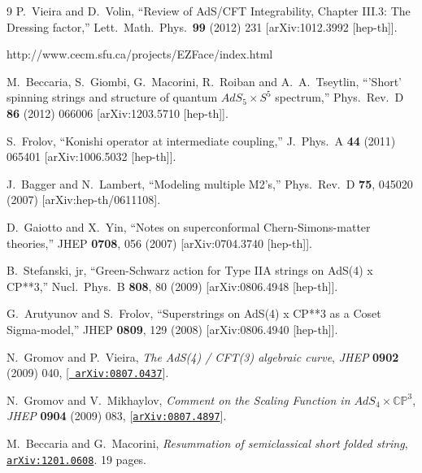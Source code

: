 \documentclass[a4paper,11pt]{article}
\numberwithin{equation}{section}
\begin{document}
\begin{thebibliography} {9}
  P.~Vieira and D.~Volin,
  ``Review of AdS/CFT Integrability, Chapter III.3: The Dressing factor,''
  Lett.\ Math.\ Phys.\  {\bf 99} (2012) 231
  [arXiv:1012.3992 [hep-th]].

 http://www.cecm.sfu.ca/projects/EZFace/index.html

  M.~Beccaria, S.~Giombi, G.~Macorini, R.~Roiban and A.~A.~Tseytlin,
  ``'Short' spinning strings and structure of quantum $AdS_5 \times S^5$ spectrum,''
  Phys.\ Rev.\ D {\bf 86} (2012) 066006
  [arXiv:1203.5710 [hep-th]].

  S.~Frolov,
  ``Konishi operator at intermediate coupling,''
  J.\ Phys.\ A {\bf 44} (2011) 065401
  [arXiv:1006.5032 [hep-th]].

  J.~Bagger and N.~Lambert,
  ``Modeling multiple M2's,''
  Phys.\ Rev.\  D {\bf 75}, 045020 (2007)
  [arXiv:hep-th/0611108].

D.~Gaiotto and X.~Yin,
  ``Notes on superconformal Chern-Simons-matter theories,''
  JHEP {\bf 0708}, 056 (2007)
  [arXiv:0704.3740 [hep-th]]. 

  B.~Stefanski, jr,
  ``Green-Schwarz action for Type IIA strings on AdS(4) x CP**3,''
  Nucl.\ Phys.\ B {\bf 808}, 80 (2009)
  [arXiv:0806.4948 [hep-th]].

  G.~Arutyunov and S.~Frolov,
  ``Superstrings on AdS(4) x CP**3 as a Coset Sigma-model,''
  JHEP {\bf 0809}, 129 (2008)
  [arXiv:0806.4940 [hep-th]].

N.~Gromov and P.~Vieira, {\it {The AdS(4) / CFT(3) algebraic curve}},  {\em
  JHEP} {\bf 0902} (2009) 040, [\href{http://xxx.lanl.gov/abs/0807.0437}{{\tt
  arXiv:0807.0437}}].

N.~Gromov and V.~Mikhaylov, {\it {Comment on the Scaling Function in
  $AdS_{4}\times \mathbb{CP}^{3}$}},  {\em JHEP} {\bf 0904} (2009) 083,
  [\href{http://xxx.lanl.gov/abs/0807.4897}{{\tt arXiv:0807.4897}}].

M.~Beccaria and G.~Macorini, {\it {Resummation of semiclassical short folded
  string}},  \href{http://xxx.lanl.gov/abs/1201.0608}{{\tt arXiv:1201.0608}}.
  19 pages.


\end{thebibliography}
\end{document}
